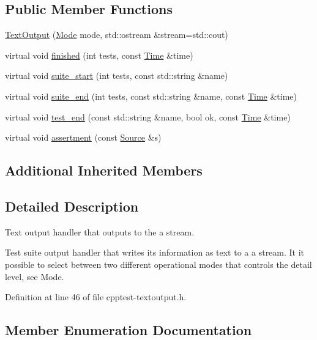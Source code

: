 \subsection*{Public Member Functions}
\begin{DoxyCompactItemize}
\item 
\hyperlink{class_test_1_1_text_output_ab9bdd9b2d9b362ca5fb148b766ecdd02}{Text\+Output} (\hyperlink{class_test_1_1_text_output_ae7b22c9458e6c566996bf4517c73feb1}{Mode} mode, std\+::ostream \&stream=std\+::cout)
\item 
virtual void \hyperlink{class_test_1_1_text_output_ad139154d84e75aaaabed7b718b0ff106}{finished} (int tests, const \hyperlink{class_test_1_1_time}{Time} \&time)
\item 
virtual void \hyperlink{class_test_1_1_text_output_afa4d83846a506b7a26622711cbd69ad1}{suite\+\_\+start} (int tests, const std\+::string \&name)
\item 
virtual void \hyperlink{class_test_1_1_text_output_a7687ec2e87ccaa901e2b7d391937a71e}{suite\+\_\+end} (int tests, const std\+::string \&name, const \hyperlink{class_test_1_1_time}{Time} \&time)
\item 
virtual void \hyperlink{class_test_1_1_text_output_a61336a8ef939a9d826d4630da8020d72}{test\+\_\+end} (const std\+::string \&name, bool ok, const \hyperlink{class_test_1_1_time}{Time} \&time)
\item 
virtual void \hyperlink{class_test_1_1_text_output_a9acf66ddd0a5f584a86e5fbdd98e5f1a}{assertment} (const \hyperlink{class_test_1_1_source}{Source} \&s)
\end{DoxyCompactItemize}
\subsection*{Additional Inherited Members}


\subsection{Detailed Description}
Text output handler that outputs to the a stream. 

Test suite output handler that writes its information as text to a a stream. It it possible to select between two different operational modes that controls the detail level, see Mode. 

Definition at line 46 of file cpptest-\/textoutput.\+h.



\subsection{Member Enumeration Documentation}
